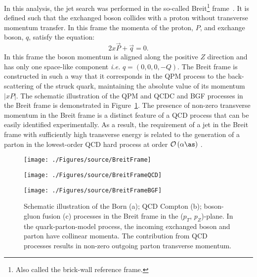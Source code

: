 In this analysis, the jet search was performed in the so-called Breit\footnote{Also called the brick-wall reference frame.} frame~\cite{feynman:1972:photon,zfp:c2:237}. It is defined such that the exchanged boson collides with a proton without transverse momentum transfer. In this frame the momenta of the proton, $P$, and exchange boson, $q$, satisfy the equation:
\begin{equation}
2x\vec{P} + \vec{q} = 0.
\label{eq:breitframe}
\end{equation}
In this frame the boson momentum is aligned along the positive $Z$ direction and has only one space-like component \textit{i.e.} $q=\left( 0, 0, 0, -Q\right)$. The Breit frame is constructed in such a way that it corresponds in the QPM process to the back-scattering of the struck quark, maintaining the absolute value of its momentum $\left|xP\right|$. The schematic illustration of the QPM and QCDC and BGF processes in the Breit frame is demonstrated in Figure~\ref{fig:breitframe}. The presence of non-zero transverse momentum in the Breit frame is a distinct feature of a QCD process that can be easily identified experimentally. As a result, the requirement of a jet in the Breit frame with sufficiently high transverse energy is related to the generation of a parton in the lowest-order QCD hard process at order $\mathcal{O}\left(\alpha\as\right)$ .
\begin{figure}
	\centering
	\begin{subfloat}[]{
		\texttt{[image: ./Figures/source/BreitFrame]}
		\label{fig:breitframeqpm}
	}%
	\end{subfloat}
	\begin{subfloat}[]{
		\texttt{[image: ./Figures/source/BreitFrameQCD]}
		\label{fig:breitframeqcd}
	}%
	\end{subfloat}
	\begin{subfloat}[]{
		\texttt{[image: ./Figures/source/BreitFrameBGF]}
		\label{fig:breitframeqcd}
	}%
	\end{subfloat}
	\caption{Schematic illustration of the Born (a); QCD Compton (b); boson-gluon fusion (c) processes in the Breit frame in the ($p_T$, $p_Z$)-plane. In the quark-parton-model process, the incoming exchanged boson and parton have collinear momenta. The contribution from QCD processes results in non-zero outgoing parton transverse momentum.}
\label{fig:breitframe}
\end{figure}